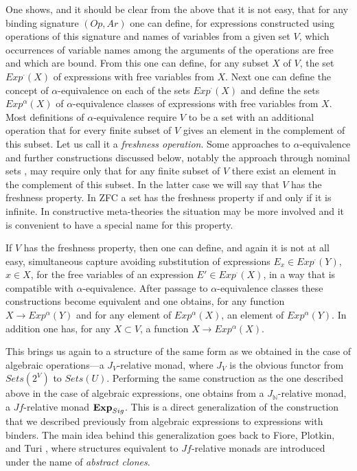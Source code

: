 \documentclass[12pt]{amsart}
\numberwithin{proposition}{subsection}
\newcommand{\sr}{\rightarrow}
\newcommand{\nn}{{\mathbb N}}
\newcommand{\nat}{\nn}
\begin{document}
One shows, and it should be clear from the above that it is not easy, that for
any binding signature $(Op,Ar)$ one can define, for expressions constructed
using operations of this signature and names of variables from a given set $V$,
which occurrences of variable names among the arguments of the operations are
free and which are bound. From this one can define, for any subset $X$ of $V$,
the set $Exp^{\cdot}(X)$ of expressions with free variables from $X$. Next one
can define the concept of $\alpha$-equivalence on each of the sets
$Exp^{\cdot}(X)$ and define the sets $Exp^{\alpha}(X)$ of $\alpha$-equivalence
classes of expressions with free variables from $X$. Most definitions of
$\alpha$-equivalence require $V$ to be a set with an additional operation that
for every finite subset of $V$ gives an element in the complement of this
subset. Let us call it a {\em freshness operation}. Some approaches to 
$\alpha$-equivalence and further constructions discussed below, notably the
approach through nominal sets \cite{Pitts}, may require only that for any
finite subset of $V$ there exist an element in the complement of this
subset. In the latter case we will say that $V$ has the freshness property. In
ZFC a set has the freshness property if and only if it is infinite. In
constructive meta-theories the situation may be more involved and it is
convenient to have a special name for this property.

If $V$ has the freshness property, then one can define, and again it is not at all
easy, simultaneous capture avoiding substitution of expressions 
$E_x\in Exp^{\cdot}(Y)$, $x\in X$, for the free variables of an expression 
$E' \in Exp^{\cdot}(X)$, in a way that is compatible with $\alpha$-equivalence.
After passage to $\alpha$-equivalence classes these constructions
become equivalent and one obtains, for any function $X\sr Exp^{\alpha}(Y)$ and for
any element of $Exp^{\alpha}(X)$, an element of $Exp^{\alpha}(Y)$. In addition
one has, for any $X\subset V$, a function $X\sr Exp^{\alpha}(X)$.

This brings us again to a structure of the same form as we obtained in the case
of algebraic operations---a $J_V$-relative monad, where $J_V$ is the obvious
functor from $Sets(2^V)$ to $Sets(U)$. Performing the same construction as the
one described above in the case of algebraic expressions, one obtains from a
$J_{\nat}$-relative monad, a $Jf$-relative monad ${\bf Exp}_{Sig}$. This is a
direct generalization of the construction that we described previously from
algebraic expressions to expressions with binders. The main idea behind this
generalization goes back to Fiore, Plotkin, and Turi \cite{FPT}, where structures
equivalent to $Jf$-relative monads are introduced under the name of
{\em abstract clones}.
\end{document}
